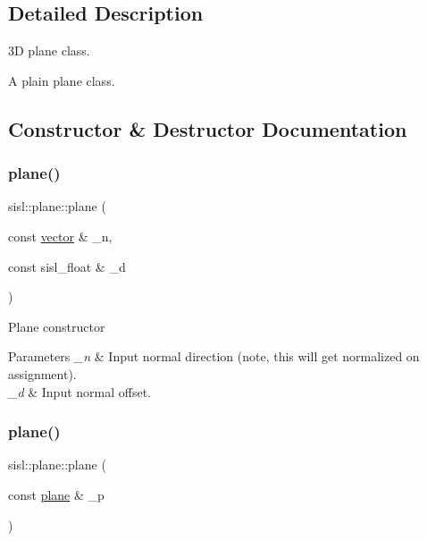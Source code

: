 \subsection{Detailed Description}
3D plane class. 

A plain plane class. 

\subsection{Constructor \& Destructor Documentation}
\mbox{\label{structsisl_1_1plane_af0b08037a91ded2c568f2a5d99418143}} 
\subsubsection{\texorpdfstring{plane()}{plane()}\hspace{0.1cm}{\footnotesize\ttfamily [1/2]}}
{\footnotesize\ttfamily sisl\+::plane\+::plane (\begin{DoxyParamCaption}\item[{const \hyperlink{namespacesisl_a2069bd5374a9be042ff3ce3306d41e1a}{vector} \&}]{\+\_\+n,  }\item[{const sisl\+\_\+float \&}]{\+\_\+d }\end{DoxyParamCaption})\hspace{0.3cm}{\ttfamily [inline]}}

Plane constructor 
\begin{DoxyParams}{Parameters}
{\em \+\_\+n} & Input normal direction (note, this will get normalized on assignment). \\
\hline
{\em \+\_\+d} & Input normal offset. \\
\hline
\end{DoxyParams}
\mbox{\label{structsisl_1_1plane_a6eea6dde0d9235a1afd383f98cfacec7}} 
\subsubsection{\texorpdfstring{plane()}{plane()}\hspace{0.1cm}{\footnotesize\ttfamily [2/2]}}
{\footnotesize\ttfamily sisl\+::plane\+::plane (\begin{DoxyParamCaption}\item[{const \hyperlink{structsisl_1_1plane}{plane} \&}]{\+\_\+p }\end{DoxyParamCaption})\hspace{0.3cm}{\ttfamily [inline]}}

